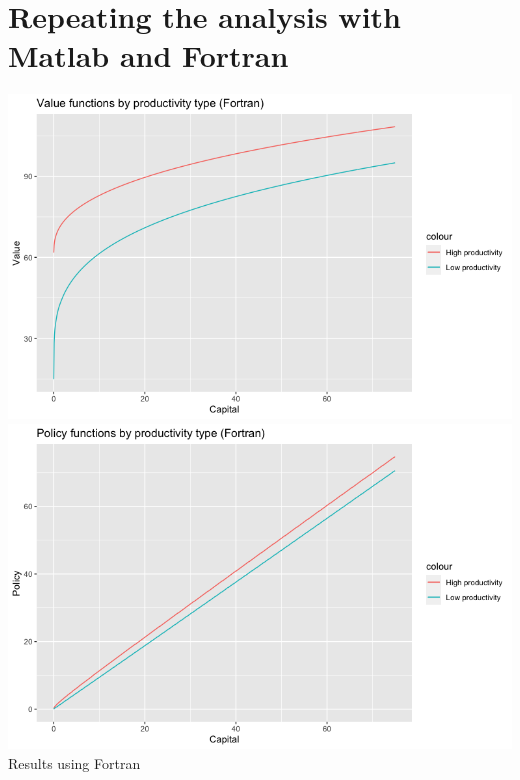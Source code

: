 \documentclass[12pt]{article}
\begin{document}
    \section{Repeating the analysis with Matlab and Fortran}
    \begin{center}
        \includegraphics[scale=0.4]{for_vf.png}\\
        \includegraphics[scale=0.4]{for_pf.png}\\
        Results using Fortran
    \end{center}
\end{document}
